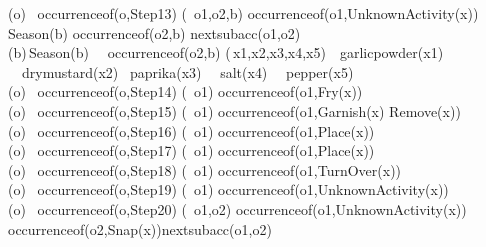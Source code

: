 \begin{center}
(\forall o) \ occurrence\textunderscore of(o,Step13) \supset (\exists\, o1,o2,b) \land occurrence\textunderscore of(o1,Unknown\textunderscore Activity(x)) \land Season(b) \land occurrence\textunderscore of(o2,b) \land next\textunderscore subacc(o1,o2)\\

(\forall b)\,Season(b) \  \land \  occurrence\textunderscore of(o2,b) \supset (\exists\,x1,x2,x3,x4,x5)\  \ garlicpowder(x1) \ \land \  drymustard(x2) \land \ paprika(x3) \   \land \ salt(x4)  \  \land \  pepper(x5) \\

(\forall o) \ occurrence\textunderscore of(o,Step14) \supset (\exists\, o1) \land occurrence\textunderscore of(o1,Fry(x)) \\

(\forall o) \ occurrence\textunderscore of(o,Step15) \supset (\exists\, o1) \land occurrence\textunderscore of(o1,Garnish(x) \land Remove(x)) \\

(\forall o) \ occurrence\textunderscore of(o,Step16) \supset (\exists\, o1) \land occurrence\textunderscore of(o1,Place(x)) \\

(\forall o) \ occurrence\textunderscore of(o,Step17) \supset (\exists\, o1) \land occurrence\textunderscore of(o1,Place(x)) \\

(\forall o) \ occurrence\textunderscore of(o,Step18) \supset (\exists\, o1) \land occurrence\textunderscore of(o1,TurnOver(x)) \\

(\forall o) \ occurrence\textunderscore of(o,Step19) \supset (\exists\, o1) \land occurrence\textunderscore of(o1,Unknown\textunderscore Activity(x)) \\

(\forall o) \ occurrence\textunderscore of(o,Step20) \supset (\exists\, o1,o2) \land occurrence\textunderscore of(o1,Unknown\textunderscore Activity(x)) \land occurrence\textunderscore of(o2,Snap(x))\land next\textunderscore subacc(o1,o2)\\

\end{center}
